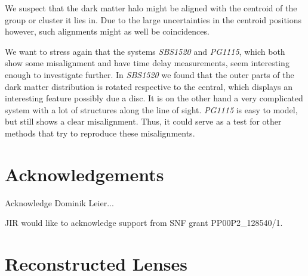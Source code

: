 \documentclass[useAMS,usenatbib]{mn2e}
\begin{document}
We suspect that the dark matter halo might be aligned with the centroid of the group or cluster it lies in. Due to the large uncertainties in the centroid positions however, such alignments might as well be coincidences.

We want to stress again that the systems \textit{SBS1520} and \textit{PG1115}, which both show some misalignment and have time delay measurements, seem interesting enough to investigate further. In \textit{SBS1520} we found that the outer parts of the dark matter distribution is rotated respective to the central, which displays an interesting feature possibly due a disc. It is on the other hand a very complicated system with a lot of structures along the line of sight. \textit{PG1115} is easy to model, but still shows a clear misalignment. Thus, it could serve as a test for other methods that try to reproduce these misalignments.


\section{Acknowledgements}\label{sec:acknowledgements}
Acknowledge Dominik Leier...

JIR would like to acknowledge support from SNF grant PP00P2\_128540/1.




\appendix
\section{Reconstructed Lenses}\label{sec:reconstructions}
\end{document}
